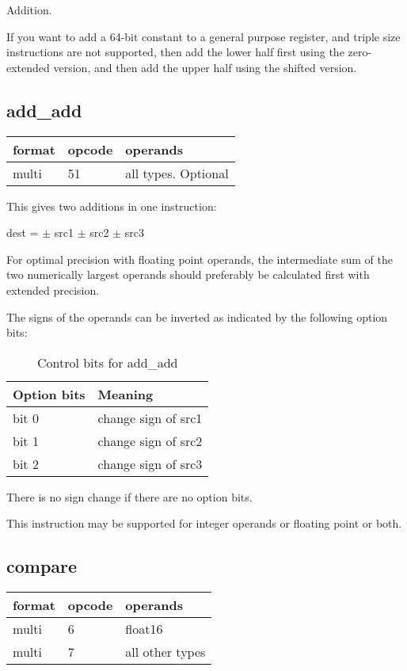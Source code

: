 \documentclass[forwardcom.tex]{subfiles}
\begin{document}
Addition.
\vv

If you want to add a 64-bit constant to a general purpose register, and triple size instructions are not supported, then add the lower half first using the zero-extended version, and then add the upper half using the shifted version.
\vv

\subsection{add\_add}
\label{table:addAddInstruction}
\begin{tabular}{|p{12mm}|p{15mm}|p{100mm}|}
\hline
\bfseries format & \bfseries opcode & \bfseries operands \\ \hline
multi & 51 & all types. Optional \\ \hline
\end{tabular}
\vspace{3mm}

This gives two additions in one instruction:
\vv

dest = $\pm$ src1 $\pm$ src2 $\pm$ src3
\vv

For optimal precision with floating point operands, the intermediate sum of the two numerically largest operands should preferably be calculated first with extended precision.
\vv

The signs of the operands can be inverted as indicated by the following option bits:

\begin{longtable} {|p{20mm}|p{75mm}|}
\caption{Control bits for add\_add} 
\label{table:ControlBitsForAddAdd} \\
\endfirsthead
\endhead
\hline
\bfseries Option bits & \bfseries Meaning   \\
\hline
bit 0 & change sign of src1 \\
bit 1 & change sign of src2 \\
bit 2 & change sign of src3 \\
\hline
\end{longtable}

There is no sign change if there are no option bits. 
\vv

This instruction may be supported for integer operands or floating point or both.
\vv

\subsection{compare} \label{compare}
\label{table:compareInstruction}
\begin{tabular}{|p{12mm}|p{15mm}|p{100mm}|}
\hline
\bfseries format & \bfseries opcode & \bfseries operands \\ \hline
multi &  6 & float16 \\ \hline
multi &  7 & all other types \\ \hline
\end{tabular}
\vv
\end{document}
